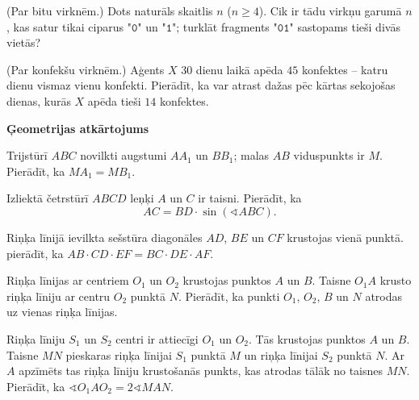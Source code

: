\documentclass[a4paper,12pt]{article}
\begin{document}
\vspace{10pt}
\begin{problem}
(Par bitu virknēm.)
Dots naturāls skaitlis $n$ ($n \geq 4$). 
Cik ir tādu virkņu garumā $n$, kas 
satur tikai ciparus "$\mathtt{0}$" un "$\mathtt{1}$"; 
turklāt fragments "$\mathtt{01}$" sastopams tieši divās vietās?
\end{problem}


\vspace{10pt}
\begin{problem} 
(Par konfekšu virknēm.)
Aģents $X$ $30$ dienu laikā apēda $45$ konfektes -- 
katru dienu vismaz vienu konfekti. 
Pierādīt, ka var atrast dažas pēc kārtas sekojošas dienas, kurās
$X$ apēda tieši $14$ konfektes.
\end{problem}





\vspace{20pt}
{\Large \bf Ģeometrijas atkārtojums}

\vspace{10pt}
\begin{problem}
Trijstūrī $ABC$ novilkti augstumi $AA_1$ un
$BB_1$; malas $AB$ viduspunkts ir $M$. 
Pierādīt, ka $MA_1 = MB_1$. 
\end{problem}

\vspace{10pt}
\begin{problem}
Izliektā četrstūrī $ABCD$ leņķi $A$ un $C$ ir taisni. 
Pierādīt, ka 
\[ AC = BD \cdot \sin ( \sphericalangle ABC). \]
\end{problem}


\vspace{10pt}
\begin{problem}
Riņķa līnijā ievilkta sešstūra diagonāles $AD$, 
$BE$ un $CF$ krustojas vienā punktā. pierādīt, ka 
$AB \cdot CD \cdot EF = BC \cdot DE \cdot AF$. 
\end{problem}

\vspace{10pt}
\begin{problem}
Riņķa līnijas ar centriem $O_1$ un $O_2$ krustojas
punktos $A$ un $B$. Taisne $O_1A$ krusto 
riņķa līniju ar centru $O_2$ punktā $N$. 
Pierādīt, ka punkti $O_1$, $O_2$, $B$ un $N$ atrodas uz
vienas riņķa līnijas. 
\end{problem}

\vspace{10pt}
\begin{problem}
Riņķa līniju $S_1$ un $S_2$ centri ir attiecīgi $O_1$ un $O_2$. 
Tās krustojas punktos $A$ un $B$. 
Taisne $MN$ pieskaras riņķa līnijai $S_1$ punktā $M$
un riņķa līnijai $S_2$ punktā $N$. 
Ar $A$ apzīmēts tas riņķa līniju krustošanās punkts, 
kas atrodas tālāk no taisnes $MN$. 
Pierādīt, ka 
$\sphericalangle O_1 A O_2 = 2 \sphericalangle MAN$. 
\end{problem}
\end{document}
